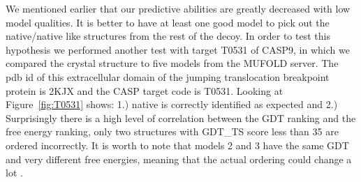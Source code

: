 \documentclass[12pt]{article}
\begin{document}
We mentioned earlier that our predictive abilities are greatly decreased with low model qualities. It is
better to have at least one good model to pick out the native/native like structures from the rest of the decoy. 
In order to test this hypothesis we performed another test with target T0531 of CASP9, in which we compared the crystal 
structure to five models from the MUFOLD server. The pdb id of this extracellular domain of the jumping translocation 
breakpoint protein is 2KJX and the CASP target code is T0531.
Looking at Figure~\ref{fig:T0531} shows: 1.) native is correctly
identified as expected and 2.) Surprisingly there is a high level of correlation between the GDT
ranking and the free energy ranking, only two structures with GDT\_TS score less than  35  are ordered
incorrectly. It is worth to note that models 2 and 3 have the same GDT and very different free
energies, meaning that the actual ordering could change a lot \cite{Perez2012}.


\end{document}
